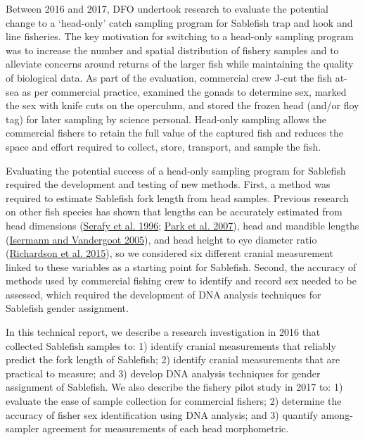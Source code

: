 \documentclass[12pt]{article}\usepackage[]{graphicx}\usepackage[]{color}
\begin{document}
Between 2016 and 2017, DFO undertook research to evaluate the potential change to a `head-only' catch sampling program for Sablefish trap and hook and line fisheries. The key motivation for switching to a head-only sampling program was to increase the number and spatial distribution of fishery samples and to alleviate concerns around returns of the larger fish while maintaining the quality of biological data. As part of the evaluation, commercial crew J-cut the fish at-sea as per commercial practice, examined the gonads to determine sex, marked the sex with knife cuts on the operculum, and stored the frozen head (and/or floy tag) for later sampling by science personal. Head-only sampling allows the commercial fishers to retain the full value of the captured fish and reduces the space and effort required to collect, store, transport, and sample the fish.

Evaluating the potential success of a head-only sampling program for Sablefish required the development and testing of new methods. First, a method was required to estimate Sablefish fork length from head samples. Previous research on other fish species has shown that lengths can be accurately estimated from head dimensions (\protect\hyperlink{ref-Serafy1996}{Serafy et al. 1996}; \protect\hyperlink{ref-Park2007}{Park et al. 2007}), head and mandible lengths (\protect\hyperlink{ref-Isermann2005}{Isermann and Vandergoot 2005}), and head height to eye diameter ratio (\protect\hyperlink{ref-Richardson2015}{Richardson et al. 2015}), so we considered six different cranial measurement linked to these variables as a starting point for Sablefish. Second, the accuracy of methods used by commercial fishing crew to identify and record sex needed to be assessed, which required the development of DNA analysis techniques for Sablefish gender assignment.

In this technical report, we describe a research investigation in 2016 that collected Sablefish samples to: 1) identify cranial measurements that reliably predict the fork length of Sablefish; 2) identify cranial measurements that are practical to measure; and 3) develop DNA analysis techniques for gender assignment of Sablefish. We also describe the fishery pilot study in 2017 to: 1) evaluate the ease of sample collection for commercial fishers; 2) determine the accuracy of fisher sex identification using DNA analysis; and 3) quantify among-sampler agreement for measurements of each head morphometric.

\clearpage
\end{document}
